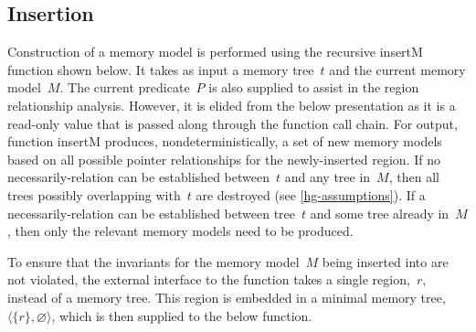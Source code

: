 \subsection{Insertion}
Construction of a memory model is performed
using the recursive \gls{insertM} function shown below.
It takes as input a memory tree~$t$ and the current memory model~$M$.
The current predicate~$P$ is also supplied
to assist in the region relationship analysis.
However, it is elided from the below presentation as it is a read-only value
that is passed along through the function call chain.
For output, function \gls{insertM} produces, nondeterministically,
a set of new memory models based on all possible pointer relationships
for the newly-inserted region.
If no necessarily-relation can be established between~$t$ and any tree in~$M$, then all trees possibly overlapping with~$t$ are destroyed (see \cref{hg-assumptions}).
If a necessarily-relation can be established between tree~$t$ and some tree already in~$M$, then only the relevant memory models need to be produced.

To ensure that the invariants for the memory model~$M$ being inserted into
are not violated, the external interface to the function takes a single region,~$r$, instead of a memory tree.
This region is embedded in a minimal memory tree,
$\langle \{r\},\varnothing\rangle$,
which is then supplied to the below function.

